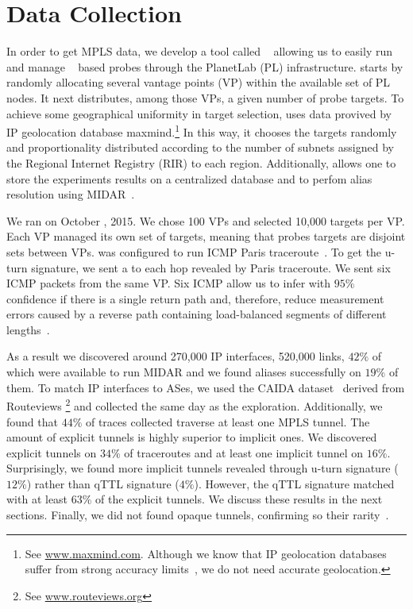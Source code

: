 \section{Data Collection}\label{dataset}
In order to get MPLS data, we develop a tool called
\magallanes~\cite{magallanes}  allowing
us to easily run and manage \scamper~\cite{Luckie10} based probes through the
PlanetLab (PL) infrastructure.  \magallanes starts by randomly allocating
several vantage points (VP) within the available set of PL nodes.  It next
distributes, among those VPs, a given number of probe targets.
To achieve some geographical uniformity in target selection, \magallanes uses
data provived by IP geolocation database maxmind.\footnote{See
\url{www.maxmind.com}.  Although we know that IP geolocation databases suffer
from strong accuracy limits~\cite{geolocation}, we do not need accurate geolocation.}  In this way, it chooses the
targets randomly and proportionality distributed according to the number of
subnets assigned by the Regional Internet Registry (RIR) to each region.
Additionally, \magallanes allows one to store the experiments results on a
centralized database and to perfom alias resolution using MIDAR~\cite{Keys13}.

We ran \magallanes on October , 2015.  We chose 100 VPs and selected
10,000 targets per VP.  Each VP managed its own set of targets, meaning that
probes targets are disjoint sets between VPs.  \scamper was configured to run
ICMP Paris traceroute~\cite{BRICE06}.  To get the u-turn signature,
we sent a \ping to each hop revealed by Paris traceroute. We sent six
ICMP \echorequest packets from the same VP.  Six ICMP \echoreply allow us to
infer with $95\%$ confidence if there is a single return path and, 
therefore, reduce measurement errors caused by a reverse path containing
load-balanced segments of different lengths~\cite{BRICE07}. 

As a result we discovered around 270,000 IP interfaces,  520,000 links, $42\%$
of which were available to run MIDAR and we found aliases successfully on $19\%$
of them. To match IP interfaces to ASes, we used the CAIDA
dataset~\cite{caida_ref} derived from Routeviews \footnote{See
\url{www.routeviews.org}} and collected the same day as the exploration.
Additionally, we found that $44\%$ of traces collected traverse at least one
MPLS tunnel.  The amount of explicit tunnels is highly superior to implicit
ones. We discovered explicit tunnels on $34\%$ of traceroutes and at least one
implicit tunnel on $16\%$. Surprisingly, we found more implicit tunnels revealed
through u-turn signature ($12\%$) rather than qTTL signature
($4\%$). However, the qTTL signature matched with at least $63\%$ of
the explicit tunnels. We discuss these results in the next sections. Finally, we
did not found opaque tunnels, confirming so their rarity~\cite{VAN2013}.
